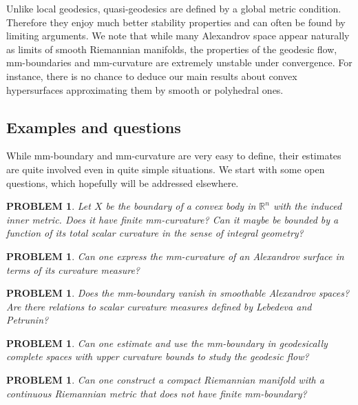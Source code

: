 \documentclass[12pt,leqno]{amsart}
\numberwithin{equation}{section}
\newtheorem{quest}[thm]{PROBLEM}
\theoremstyle{definition}
\theoremstyle{remark}
\newcommand{\R}{\mathbb{R}}
\begin{document}
Unlike local geodesics, quasi-geodesics are defined by a global metric condition. Therefore they enjoy much better stability properties
and can often be found by limiting arguments.
We note that while many Alexandrov space appear naturally  as limits of smooth Riemannian manifolds, the properties of the geodesic flow, mm-boundaries and mm-curvature are extremely unstable under
convergence.  For instance, there is  no chance to deduce our main results about convex hypersurfaces approximating them by smooth or polyhedral ones.






\subsection{Examples and questions} \label{subsec:example}
 While mm-boundary and mm-curvature are very easy to define,
their estimates are quite involved even in  quite  simple situations.
We start with some open questions, which hopefully will be addressed elsewhere.










\begin{quest} Let $X$ be the boundary of a convex body in $\R ^n$ with the induced inner metric.
Does it have finite mm-curvature?  Can it maybe be bounded by a function of its total scalar curvature
in the sense of integral geometry?
\end{quest}


\begin{quest}
Can one express the mm-curvature of an Alexandrov  surface in terms of its curvature measure?
\end{quest}

\begin{quest}
Does the mm-boundary vanish  in smoothable Alexandrov spaces?   Are there relations to scalar curvature measures defined by Lebedeva and Petrunin?
\end{quest}


\begin{quest}
Can one estimate and use the mm-boundary in geodesically complete spaces with upper curvature bounds to study the geodesic flow?
\end{quest}



\begin{quest}
 Can one construct a compact Riemannian manifold with a continuous Riemannian metric
that does not have finite mm-boundary?
\end{quest}
\end{document}
